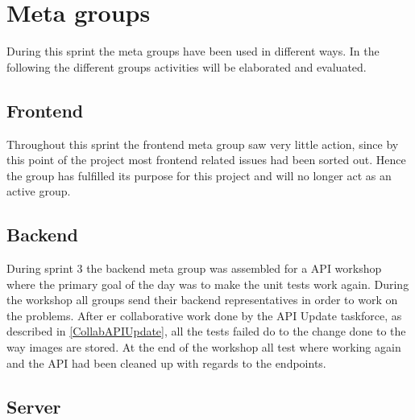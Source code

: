 \section{Meta groups}
During this sprint the meta groups have been used in different ways. 
In the following the different groups activities will be elaborated and evaluated.

\subsection{Frontend}
Throughout this sprint the frontend meta group saw very little action, since by this point of the project most frontend related issues had been sorted out. 
Hence the group has fulfilled its purpose for this project and will no longer act as an active group.

\subsection{Backend}
During sprint 3 the backend meta group was assembled for a API workshop where the primary goal of the day was to make the unit tests work again.
During the workshop all groups send their backend representatives in order to work on the problems.
After er collaborative work done by the API Update taskforce, as described in \autoref{CollabAPIUpdate}, all the tests failed do to the change done to the way images are stored. 
At the end of the workshop all test where working again and the API had been cleaned up with regards to the endpoints. 

\subsection{Server}

